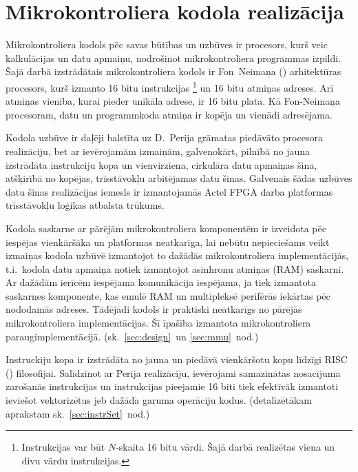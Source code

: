 \section{Mikrokontroliera kodola realizācija} \label{sec:cpu}
	Mikrokontroliera kodols pēc savas būtības un uzbūves ir procesors,
	kurš veic kalkulācijas un datu apmaiņu, nodrošinot mikrokontroliera
	programmas izpildi.
	Šajā darbā izstrādātais mikrokontroliera kodols ir 
	Fon~Neimaņa () arhitektūras pro\-ce\-sors, kurš
	izmanto 16 bitu instrukcijas%
		\footnote{Instrukcijas var būt $N$-skaita 16 bitu vārdi. 
		Šajā darbā realizētas viena un divu vārdu instrukcijas.}
	un 16 bitu atmiņas adreses. Arī atmiņas vienība, kurai pieder unikāla
	adrese, ir 16 bitu plata. Kā Fon-Neimaņa procesoram, datu un
	programmkoda atmiņa ir kopēja un vienādi adresējama.
	
	Kodola uzbūve ir daļēji balstīta uz D.~Perija grāmatas%
	\cite{Perry-VHDL} piedāvāto procesora reali\-zā\-ciju, 
	bet ar ievērojamām izmaiņām, galvenokārt, pilnībā no jauna izstrādāta 
	instrukciju kopa un vienvirziena,
	cirkulāra datu apmaiņas šina, atšķirībā no kopējas,
	trīs\-stāvokļu arbitējamas datu šinas.
	Galvenais šādas uzbūves datu šinas realizācijas iemesls
	ir izmantojamās Actel FPGA darba platformas trīs\-stāvokļu
	loģikas atbalsta \mbox{trūkums.\cite[18.~lpp.]{FusionFAQ}}
	
	Kodola saskarne ar pārējām mikrokontroliera komponentēm ir izveidota
	pēc iespējas vienkāršāka un platformas neatkarīga, lai nebūtu nepieciešams
	veikt izmaiņas kodola uzbūvē izmantojot to dažādās mikrokontroliera
	implementācijās, t.i.~kodola datu apmaiņa notiek izmantojot
	asinhronu atmiņas (RAM)	saskarni. Ar dažādām ierīcēm iespējama
	komunikācija iespējama, ja tiek izmantota saskarnes komponente, kas
	emulē RAM un multipleksē perifērās iekārtas pēc nododamās adreses.
	Tādējādi kodols	ir praktiski neatkarīgs no pārējās 
	mikrokontroliera implementācijas.
	Šī īpašība izmantota mikrokontroliera paraugimplementācijā.
	(sk.~\ref{sec:design}~un \ref{sec:mmu}~nod.)
	
	Instruckiju kopa ir izstrādāta no jauna un piedāvā vienkāršotu
	kopu līdzīgi RISC ()
	filo\-so\-fijai. Salīdzinot ar Perija realizāciju, ievērojami samazinātas
	nosacījuma zarošanās instrukcijas un instrukcijas pieejamie 16 biti
	tiek efektīvāk izmantoti ieviešot vektorizētus jeb dažāda garuma
	operāciju kodus. (detalizētākam aprakstam sk.~\ref{sec:instrSet}~nod.)
	
